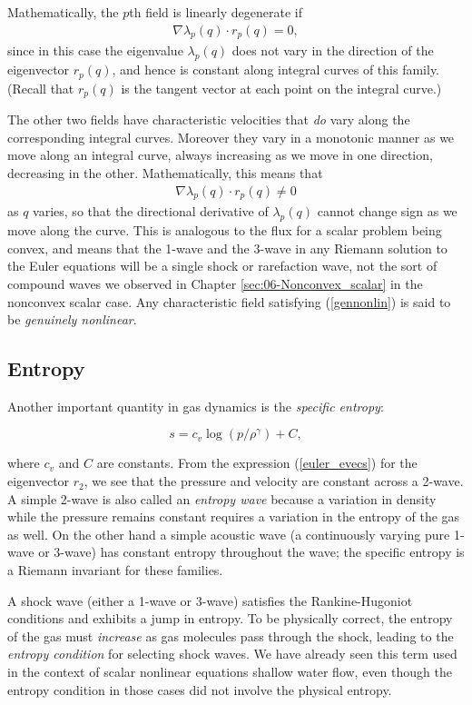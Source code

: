 \documentclass{SIAMbook2016}
\begin{document}
Mathematically, the \(p\)th field is linearly degenerate if
\begin{align}\label{lindegen}
\nabla \lambda_p(q) \cdot r_p(q) = 0,
\end{align} since in this case the eigenvalue \(\lambda_p(q)\) does not
vary in the direction of the eigenvector \(r_p(q)\), and hence is
constant along integral curves of this family. (Recall that \(r_p(q)\)
is the tangent vector at each point on the integral curve.)

The other two fields have characteristic velocities that \emph{do} vary
along the corresponding integral curves. Moreover they vary in a
monotonic manner as we move along an integral curve, always increasing
as we move in one direction, decreasing in the other. Mathematically,
this means that \begin{align}\label{gennonlin}
\nabla \lambda_p(q) \cdot r_p(q) \ne 0
\end{align} as \(q\) varies, so that the directional derivative of
\(\lambda_p(q)\) cannot change sign as we move along the curve. This is
analogous to the flux for a scalar problem being convex, and means that
the 1-wave and the 3-wave in any Riemann solution to the Euler equations
will be a single shock or rarefaction wave, not the sort of compound
waves we observed in Chapter \ref{sec:06-Nonconvex_scalar} in the
nonconvex scalar case. Any characteristic field satisfying
(\ref{gennonlin}) is said to be \emph{genuinely nonlinear}.

\hypertarget{entropy}{%
\subsection{Entropy}\label{entropy}}

Another important quantity in gas dynamics is the \emph{specific
entropy}:

\[ s = c_v \log(p/\rho^\gamma) + C,\]

where \(c_v\) and \(C\) are constants. From the expression
(\ref{euler_evecs}) for the eigenvector \(r_2\), we see that the
pressure and velocity are constant across a 2-wave. A simple 2-wave is
also called an \emph{entropy wave} because a variation in density while
the pressure remains constant requires a variation in the entropy of the
gas as well. On the other hand a simple acoustic wave (a continuously
varying pure 1-wave or 3-wave) has constant entropy throughout the wave;
the specific entropy is a Riemann invariant for these families.

A shock wave (either a 1-wave or 3-wave) satisfies the Rankine-Hugoniot
conditions and exhibits a jump in entropy. To be physically correct, the
entropy of the gas must \emph{increase} as gas molecules pass through
the shock, leading to the \emph{entropy condition} for selecting shock
waves. We have already seen this term used in the context of scalar
nonlinear equations shallow water flow, even though the entropy
condition in those cases did not involve the physical entropy.
\end{document}
